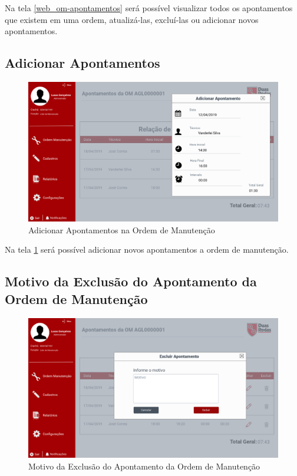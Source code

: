 {Na tela \ref{web_om-apontamentos} será possível visualizar todos os apontamentos que existem em uma ordem, atualizá-las, excluí-las ou adicionar novos apontamentos.

\newpage
\subsection{Adicionar Apontamentos}

\begin{figure}[htb]
	\caption{\label{web_om-add-apontamento}Adicionar Apontamentos na Ordem de Manutenção}
	\begin{center}
		\includegraphics[scale=0.40]{./Figuras/web/om-add-apontamento.png}
	\end{center}
\end{figure}

Na tela \ref{web_om-add-apontamento} será possível adicionar novos apontamentos a ordem de manutenção.

\newpage
\subsection{Motivo da Exclusão do Apontamento da Ordem de Manutenção}

\begin{figure}[htb]
	\caption{\label{web_om-excluir-apontamento-motivo}Motivo da Exclusão do Apontamento da Ordem de Manutenção}
	\begin{center}
		\includegraphics[scale=0.40]{./Figuras/web/om-excluir-apontamento-motivo.png}
	\end{center}
\end{figure}

}
